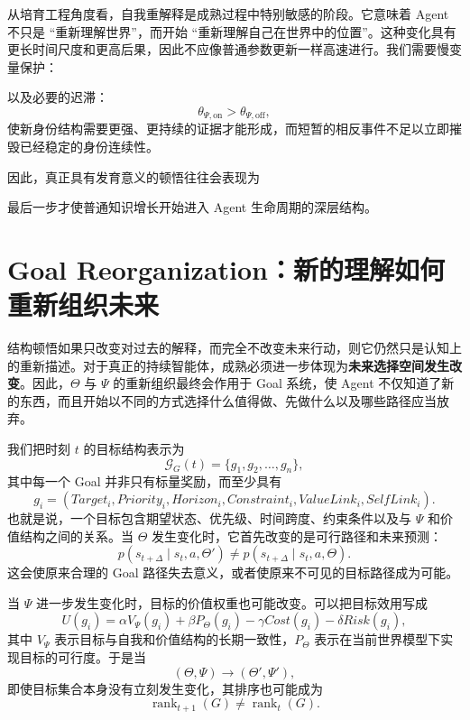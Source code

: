 从培育工程角度看，自我重解释是成熟过程中特别敏感的阶段。它意味着 Agent 不只是 ``重新理解世界''，而开始 ``重新理解自己在世界中的位置''。这种变化具有更长时间尺度和更高后果，因此不应像普通参数更新一样高速进行。我们需要慢变量保护：
\begin{statementbox}
\centering
{}
\end{statementbox}
以及必要的迟滞：
\[
\theta_{\Psi,\mathrm{on}}
>
\theta_{\Psi,\mathrm{off}},
\]
使新身份结构需要更强、更持续的证据才能形成，而短暂的相反事件不足以立即摧毁已经稳定的身份连续性。

因此，真正具有发育意义的顿悟往往会表现为
\begin{statementbox}
\centering
{}
\end{statementbox}
最后一步才使普通知识增长开始进入 Agent 生命周期的深层结构。

\section{Goal Reorganization：新的理解如何重新组织未来}

结构顿悟如果只改变对过去的解释，而完全不改变未来行动，则它仍然只是认知上的重新描述。对于真正的持续智能体，成熟必须进一步体现为\textbf{未来选择空间发生改变}。因此，$\Theta$ 与 $\Psi$ 的重新组织最终会作用于 Goal 系统，使 Agent 不仅知道了新的东西，而且开始以不同的方式选择什么值得做、先做什么以及哪些路径应当放弃。

我们把时刻 $t$ 的目标结构表示为
\[
\mathcal G_G(t)
=
\{g_1,g_2,\ldots,g_n\},
\]
其中每一个 Goal 并非只有标量奖励，而至少具有
\[
g_i
=
(
Target_i,
Priority_i,
Horizon_i,
Constraint_i,
ValueLink_i,
SelfLink_i
).
\]
也就是说，一个目标包含期望状态、优先级、时间跨度、约束条件以及与 $\Psi$ 和价值结构之间的关系。当 $\Theta$ 发生变化时，它首先改变的是可行路径和未来预测：
\[
p(
s_{t+\Delta}
\mid
s_t,a,\Theta'
)
\neq
p(
s_{t+\Delta}
\mid
s_t,a,\Theta
).
\]
这会使原来合理的 Goal 路径失去意义，或者使原来不可见的目标路径成为可能。

当 $\Psi$ 进一步发生变化时，目标的价值权重也可能改变。可以把目标效用写成
\[
U(g_i)
=
\alpha V_{\Psi}(g_i)
+
\beta P_{\Theta}(g_i)
-
\gamma Cost(g_i)
-
\delta Risk(g_i),
\]
其中 $V_{\Psi}$ 表示目标与自我和价值结构的长期一致性，$P_{\Theta}$ 表示在当前世界模型下实现目标的可行度。于是当
\[
(\Theta,\Psi)
\rightarrow
(\Theta',\Psi'),
\]
即使目标集合本身没有立刻发生变化，其排序也可能成为
\[
\operatorname{rank}_{t+1}(G)
\neq
\operatorname{rank}_{t}(G).
\]


